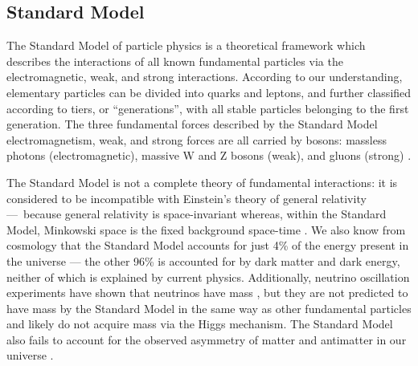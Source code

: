 \subsection{Standard Model}
The Standard Model of particle physics is a theoretical framework which describes the interactions of all known fundamental particles via the electromagnetic, weak, and strong interactions. According to our understanding, elementary particles can be divided into quarks and leptons, and further classified according to tiers, or ``generations'', with all stable particles belonging to the first generation. The three fundamental forces described by the Standard Model \textendash electromagnetism, weak, and strong forces \textendash are all carried by bosons: massless photons (electromagnetic), massive W and Z bosons (weak), and gluons (strong) \cite{CERN:SM:Online}.

The Standard Model is not a complete theory of fundamental interactions: it is considered to be incompatible with Einstein's theory of general relativity — because general relativity is space-invariant whereas, within the Standard Model, Minkowski space is the fixed background space-time \cite{Colosi:2005:CQG}. We also know from cosmology that the Standard Model accounts for just 4\% of the energy present in the universe — the other 96\% is accounted for by dark matter and dark energy, neither of which is explained by current physics\cite{Krauss:2009:Conference}. Additionally, neutrino oscillation experiments have shown that neutrinos have mass \cite{Fukuda:1998:Kamiokande}, but they are not predicted to have mass by the Standard Model in the same way as other fundamental particles and likely do not acquire mass via the Higgs mechanism. The Standard Model also fails to account for the observed asymmetry of matter and antimatter in our universe \cite{Sather:1999:MatterA}.


